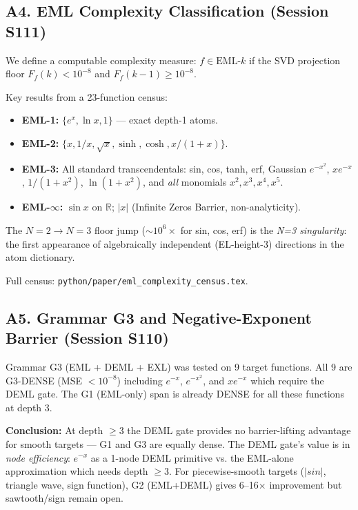 \subsection*{A4. EML Complexity Classification (Session S111)}

We define a computable complexity measure: $f \in \mathrm{EML}\text{-}k$
if the SVD projection floor $F_f(k) < 10^{-8}$ and $F_f(k-1) \geq 10^{-8}$.

Key results from a 23-function census:
\begin{itemize}
  \item \textbf{EML-1:} $\{e^x, \ln x, 1\}$ — exact depth-1 atoms.
  \item \textbf{EML-2:} $\{x, 1/x, \sqrt{x}, \sinh, \cosh, x/(1+x)\}$.
  \item \textbf{EML-3:} All standard transcendentals: sin, cos, tanh, erf,
        Gaussian $e^{-x^2}$, $x e^{-x}$, $1/(1+x^2)$, $\ln(1+x^2)$, and
        \emph{all} monomials $x^2, x^3, x^4, x^5$.
  \item \textbf{EML-$\infty$:} $\sin x$ on $\mathbb{R}$; $|x|$
        (Infinite Zeros Barrier, non-analyticity).
\end{itemize}

The $N=2 \to N=3$ floor jump ($\sim 10^6\times$ for sin, cos, erf)
is the \emph{N=3 singularity}: the first appearance of algebraically
independent (EL-height-3) directions in the atom dictionary.

Full census: \texttt{python/paper/eml\_complexity\_census.tex}.

\subsection*{A5. Grammar G3 and Negative-Exponent Barrier (Session S110)}

Grammar G3 (EML + DEML + EXL) was tested on 9 target functions.
All 9 are G3-DENSE (MSE $< 10^{-8}$) including $e^{-x}$, $e^{-x^2}$,
and $x e^{-x}$ which require the DEML gate.
The G1 (EML-only) span is already DENSE for all these functions at depth 3.

\textbf{Conclusion:} At depth $\geq 3$ the DEML gate provides no barrier-lifting
advantage for smooth targets — G1 and G3 are equally dense.
The DEML gate's value is in \emph{node efficiency}: $e^{-x}$ as a 1-node
DEML primitive vs. the EML-alone approximation which needs depth $\geq 3$.
For piecewise-smooth targets ($|sin|$, triangle wave, sign function),
G2 (EML+DEML) gives 6--16$\times$ improvement but sawtooth/sign remain open.

